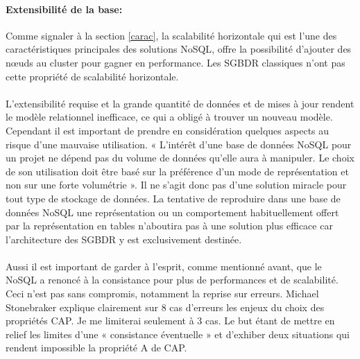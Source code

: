 \paragraph{Extensibilité de la base:} Comme signaler à la section \ref{carac}, 
la scalabilité horizontale qui est l'une des caractéristiques principales 
des solutions \textsf{NoSQL}, offre la possibilité 
d'ajouter des nœuds au cluster pour gagner en performance. Les \textsf{SGBDR} classiques 
n'ont pas cette propriété de scalabilité horizontale.
\\ 
\\ 
L'extensibilité requise et la grande quantité de données
et de mises à jour rendent le modèle relationnel inefficace, ce qui a
obligé à trouver un nouveau modèle. Cependant il est important de prendre en
considération quelques aspects au risque d'une mauvaise utilisation. «
L’intérêt d’une base de données \textsf{NoSQL} pour un projet ne
dépend pas du volume de données qu’elle aura à manipuler. Le choix de
son utilisation doit être basé sur la préférence d’un mode de
représentation et non sur une forte volumétrie
»\cite{NoSQLeurope}. Il ne s’agit donc pas d’une solution
miracle pour tout type de stockage de données.  La tentative de
reproduire dans une base de données \textsf{NoSQL} une représentation
ou un comportement habituellement offert par la représentation en tables
n'aboutira pas à une solution plus efficace car l'architecture des 
\textsf{SGBDR} y est exclusivement destinée.
\\
\\
Aussi il est important de garder à l'esprit, comme mentionné avant, 
que le \textsf{NoSQL} a renoncé à la consistance
pour plus de performances et de scalabilité. Ceci n'est pas sans compromis, notamment 
la reprise sur erreurs. 
\textsf{Michael Stonebraker} explique clairement sur 8 cas d'erreurs 
les enjeux du choix
des propriétés \textsf{CAP}\cite{MichaelStonebraker}. Je me limiterai seulement à
3 cas. Le but étant de mettre en relief les limites d'une « \textsf{consistance éventuelle} »
et d'exhiber deux situations qui rendent impossible la propriété \textsf{A} de \textsf{CAP}.
\def\exemple{We assume a typical hardware model of a
collection of local processing and storage nodes assembled into a cluster using LAN networking.
The clusters, in turn, are wired together using WAN networking.
Let’s start with a discussion of what causes errors in databases:}

